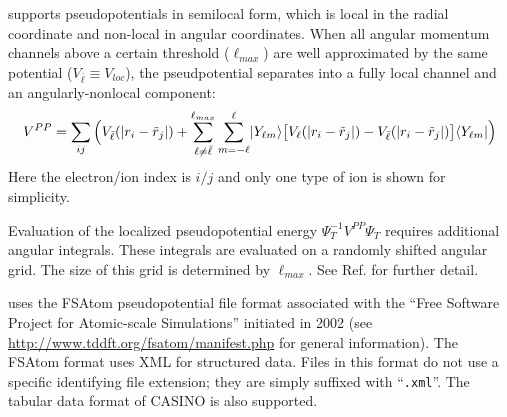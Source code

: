 \qmcpack supports pseudopotentials in semilocal form, which is local in the radial coordinate and non-local in angular coordinates.  When all angular momentum channels above a certain threshold ($\ell_{max}$) are well approximated by the same potential ($V_{\bar{\ell}}\equiv V_{loc}$), the pseudpotential separates into a fully local channel and an angularly-nonlocal component:
\begin{align}
  V^{PP} = \sum_{ij}\Big(V_{\bar{\ell}}(\abs{r_i-\tilde{r}_j}) + \sum_{\ell\ne\bar{\ell}}^{\ell_{max}}\sum_{m=-\ell}^\ell \operator{Y_{\ell m}}{\big[V_\ell(\abs{r_i-\tilde{r}_j}) - V_{\bar{\ell}}(\abs{r_i-\tilde{r}_j}) \big]}{Y_{\ell m}} \Big)
\end{align}  
Here the electron/ion index is $i/j$ and only one type of ion is shown for simplicity.

Evaluation of the localized pseudopotential energy $\Psi_T^{-1}V^{PP}\Psi_T$ requires additional angular integrals.  These integrals are evaluated on a randomly shifted angular grid.  The size of this grid is determined by $\ell_{max}$.  See Ref. \cite{Mitas1991} for further detail. 

\qmcpack uses the FSAtom pseudopotential file format associated with the ``Free Software Project for Atomic-scale Simulations'' initiated in 2002  (see \url{http://www.tddft.org/fsatom/manifest.php} for general information).  The FSAtom format uses XML for structured data.  Files in this format do not use a specific identifying file extension; they are simply suffixed with ``\texttt{.xml}''.  The tabular data format of CASINO is also supported.






